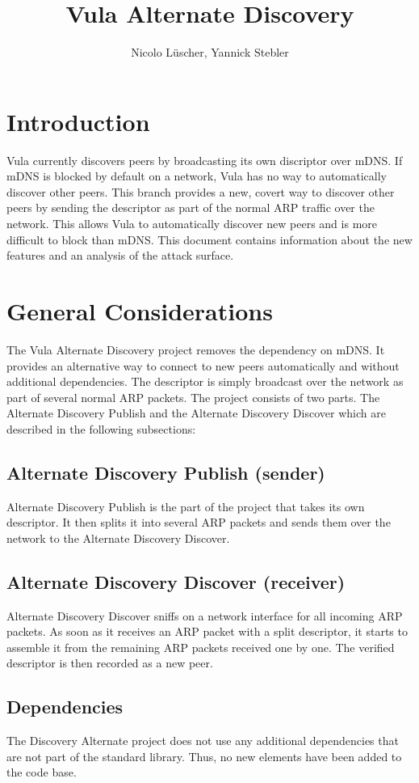 \documentclass[a4paper,11pt]{report}
\title{Vula Alternate Discovery}
\author{Nicolo Lüscher, Yannick Stebler}
\begin{document}
\maketitle
\tableofcontents

\chapter{Introduction}
Vula currently discovers peers by broadcasting its own discriptor over mDNS. 
If mDNS is blocked by default on a network, Vula has no way to automatically discover other peers. This branch provides a new, covert way to discover other peers by sending the descriptor as part of the normal ARP traffic over the network. This allows Vula to automatically discover new peers and is more difficult to block than mDNS. This document contains information about the new features and an analysis of the attack surface. 

\chapter{General Considerations}
The Vula Alternate Discovery project removes the dependency on mDNS. It provides an alternative way to connect to new peers automatically and without additional dependencies. The descriptor is simply broadcast over the network as part of several normal ARP packets.
The project consists of two parts. The Alternate Discovery Publish and the Alternate Discovery Discover which are described in the following subsections:
\section{Alternate Discovery Publish (sender)}
Alternate Discovery Publish is the part of the project that takes its own descriptor. It then splits it into several ARP packets and sends them over the network to the Alternate Discovery Discover. 
\section{Alternate Discovery Discover (receiver)}
Alternate Discovery Discover sniffs on a network interface for all incoming ARP packets. As soon as it receives an ARP packet with a split descriptor, it starts to assemble it from the remaining ARP packets received one by one. The verified descriptor is then recorded as a new peer.
\section{Dependencies}
The Discovery Alternate project does not use any additional dependencies that are not part of the standard library. Thus, no new elements have been added to the code base.
\end{document}
